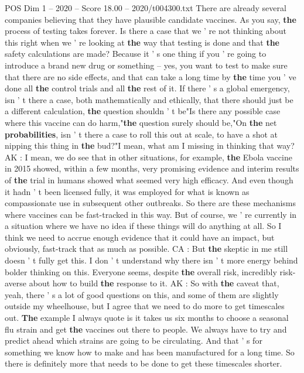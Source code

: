 \begin{textsample}{POS Dim 1 – 2020 – Score 18.00 – 2020/t004300.txt}
There are already several companies believing that they have plausible candidate vaccines.
As you say, \textbf{the} process of testing takes forever.
Is there a case that we ' re not thinking about this right when we ' re looking at \textbf{the} way that testing is done and that \textbf{the} safety calculations are made?
Because it ' s one thing if you ' re going to introduce a brand new drug or something -- yes, you want to test to make sure that there are no side effects, and that can take a long time by \textbf{the} time you ' ve done all \textbf{the} control trials and all \textbf{the} rest of it.
If there ' s a global emergency, isn ' t there a case, both mathematically and ethically, that there should just be a different calculation, \textbf{the} question shouldn ' t be"Is there any possible case where this vaccine can do harm,"\textbf{the} question surely should be,"On \textbf{the} net \textbf{probabilities}, isn ' t there a case to roll this out at scale, to have a shot at nipping this thing in \textbf{the} bud?"I mean, what am I missing in thinking that way?
AK : I mean, we do see that in other situations, for example, \textbf{the} Ebola vaccine in 2015 showed, within a few months, very promising evidence and interim results of \textbf{the} trial in humans showed what seemed very high efficacy.
And even though it hadn ' t been licensed fully, it was employed for what is known as compassionate use in subsequent other outbreaks.
So there are these mechanisms where vaccines can be fast-tracked in this way.
But of course, we ' re currently in a situation where we have no idea if these things will do anything at all.
So I think we need to accrue enough evidence that it could have an impact, but obviously, fast-track that as much as possible.
CA : But \textbf{the} skeptic in me still doesn ' t fully get this.
I don ' t understand why there isn ' t more energy behind bolder thinking on this.
Everyone seems, despite \textbf{the} overall risk, incredibly risk-averse about how to build \textbf{the} response to it.
AK : So with \textbf{the} caveat that, yeah, there ' s a lot of good questions on this, and some of them are slightly outside my wheelhouse, but I agree that we need to do more to get timescales out. \textbf{The} example I always quote is it takes us six months to choose a seasonal flu strain and get \textbf{the} vaccines out there to people.
We always have to try and predict ahead which strains are going to be circulating.
And that ' s for something we know how to make and has been manufactured for a long time.
So there is definitely more that needs to be done to get these timescales shorter.

\end{textsample}
